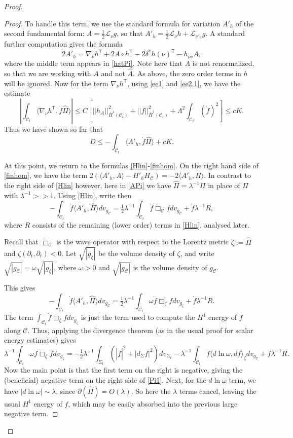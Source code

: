 \documentclass[10pt]{amsart}
\renewcommand{\d}{\delta}
\newcommand{\Si}{\Sigma}
\renewcommand{\l}{\lambda}
\renewcommand{\o}{\omega}
\newcommand{\cC}{{\mathcal C}}
\newcommand{\cL}{{\mathcal L}}
\newcommand{\tT}{\mathsf{T}}
\newcommand{\be}{\begin{equation}}
\newcommand{\ee}{\end{equation}}
\newcommand{\p}{\partial}
\renewcommand{\hat}{\widehat}
\newcommand{\<}{\langle}
\renewcommand{\>}{\rangle}
\newcommand{\w}{\widetilde}
\theoremstyle{plain}
\theoremstyle{remark}
\theoremstyle{definition}
\numberwithin{equation}{section}
\begin{document}
\begin{proof}
\begin{proof}
   To handle this term, we use the standard formula for variation $A'_h$ of the second fundamental form: $A = \frac{1}{2}\cL_{\nu}g$, so 
that $A'_h = \frac{1}{2} \cL_{\nu}h + \cL_{\nu'_h}g$. A standard further computation gives the formula 
\be \label{A'}
2A'_h = \nabla_{\nu}h^{\tT} + 2A\circ h^{\tT} - 2 \d^* h(\nu)^{\tT} - h_{\nu \nu}A,
\ee
where the middle term appears in \eqref{hatPi}. Note here that $A$ is not renormalized, so that we are working with $A$ and not $\hat A$. 
As above, the zero order terms in $h$ will be ignored. Now for the term $\nabla_{\nu}h^{\tT}$, using \eqref{ee1} and \eqref{ee2.1}, we have the estimate 
$$|\int_{\cC_t}\<\nabla_{\nu} h^{\tT}, \dot f \hat \Pi\> | \leq C[||h_A||_{\bar H^1(\cC_t)}^2 + ||f||_{\bar H^1(\cC_t)}^2 + \Lambda^2 \int_{\cC_t} (\dot f)^2 ] \leq cK.$$
Thus we have shown so far that 
\be \label{APi}
D \leq -\int_{\cC_t}\<A'_h, \dot f \hat \Pi\> + cK.
\ee

  At this point, we return to the formulas \eqref{Hlin}-\eqref{finhom}. On the right hand side of \eqref{finhom}, we have the term $2(\<A'_h, A\> - H'_h H_{\cC}) = 
  -2\<A'_h, \Pi\>$. In contrast to the right side of \eqref{Hlin} however, here in \eqref{APi} we have $\hat \Pi = \l^{-1}\Pi$ in place of $\Pi$ with $\l^{-1} > > 1$. 
Using \eqref{Hlin}, write then 
\be \label{hatPi2}
-\int_{\cC_t}\dot f \<A'_h, \hat \Pi\> dv_{g_{\cC}} = \tfrac{1}{2}\l^{-1}\int_{\cC_t} \dot f \w \Box_{\cC}f dv_{g_{\cC}} + \dot f \l^{-1}R,
\ee
where $R$ consists of the remaining (lower order) terms in \eqref{Hlin}, analysed later. 

  Recall that $\w \Box_{\cC}$ is the wave operator with respect to the Lorentz metric $\zeta := \hat \Pi$ and $\zeta(\p_t, \p_t) < 0$. Let $\sqrt{|g_{\zeta}|}$ be 
the volume density of $\zeta$, and write $\sqrt{|g_{\cC}|} = \o \sqrt{|g_{\zeta}|}$, where $\o > 0$ and $\sqrt{|g_{\cC}|}$ is the volume density of $g_{\cC}$. 

  This gives 
$$-\int_{\cC_t} \dot f \<A'_h, \hat \Pi\> dv_{g_{\cC}} = \tfrac{1}{2}\l^{-1}\int_{\cC_t} \o\dot f \Box_{\zeta}f dv_{g_{\zeta}} + \dot f \l^{-1}R.$$
The term $\int_{\cC_t}\dot f \Box_{\zeta}f dv_{g_{\zeta}}$ is just  the term used to compute the $H^1$ energy of $f$ along $\cC$. Thus, applying 
the divergence theorem (as in the usual proof for scalar energy estimates) gives 
\be \label{linverse}
\l^{-1}\int_{\cC_t}\o\dot f \Box_{\zeta}f dv_{g_{\zeta}} = - \tfrac{1}{2}\l^{-1}\int_{\Si_t} (|\dot f|^2 + |d_{\Si} f|^2) dv_{\Si_t} - \l^{-1}\int_{\cC_t} \dot f \<d \ln \o, df\>_{\zeta}dv_{g_{\cC}} 
+ \dot f \l^{-1}R.
\ee
Now the main point is that the first term on the right is negative, giving the (beneficial) negative term on the right side of \eqref{Pi1}. Next, for the $d\ln \o$ term, we have 
$|d\ln \o| \sim \l$, since $\p(\hat \Pi) = O(\l)$. So here the $\l$ terms cancel, leaving the usual $H^1$ energy of $f$, which may be easily absorbed into the 
previous large negative term. 


\end{proof}
\end{proof}
\end{document}
